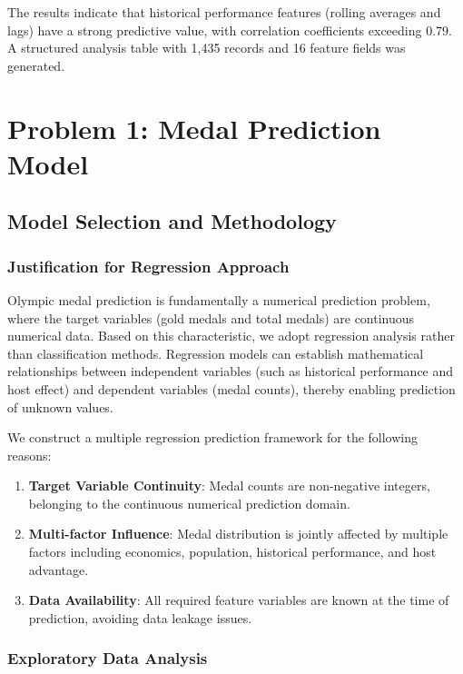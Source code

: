 \documentclass{mcmthesis}
\begin{document}
The results indicate that historical performance features (rolling averages and lags) have a strong predictive value, with correlation coefficients exceeding 0.79. A structured analysis table with 1,435 records and 16 feature fields was generated.

\section{Problem 1: Medal Prediction Model}

\subsection{Model Selection and Methodology}

\subsubsection{Justification for Regression Approach}

Olympic medal prediction is fundamentally a numerical prediction problem, where the target variables (gold medals and total medals) are continuous numerical data. Based on this characteristic, we adopt regression analysis rather than classification methods. Regression models can establish mathematical relationships between independent variables (such as historical performance and host effect) and dependent variables (medal counts), thereby enabling prediction of unknown values.

We construct a multiple regression prediction framework for the following reasons:
\begin{enumerate}
    \item \textbf{Target Variable Continuity}: Medal counts are non-negative integers, belonging to the continuous numerical prediction domain.
    \item \textbf{Multi-factor Influence}: Medal distribution is jointly affected by multiple factors including economics, population, historical performance, and host advantage.
    \item \textbf{Data Availability}: All required feature variables are known at the time of prediction, avoiding data leakage issues.
\end{enumerate}

\subsubsection{Exploratory Data Analysis}
\end{document}
